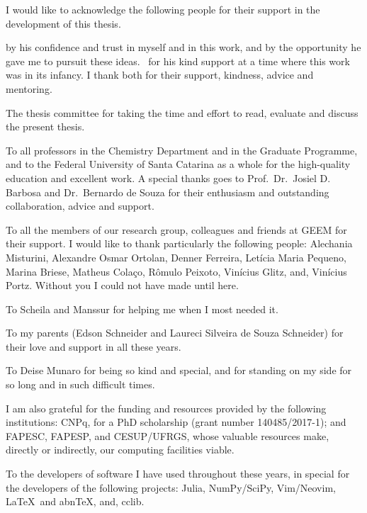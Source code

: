 \begin{agradecimentos}[Acknowledgements]
I would like to acknowledge the following people for their support in the
development of this thesis.

\imprimirorientador by his confidence and trust in myself and in this work, and by the
opportunity he gave me to pursuit these ideas.
\imprimircoorientador\ for his kind support at a time where this work was in its
infancy.
I thank both for their support, kindness, advice and mentoring.

The thesis committee for taking the time and effort to read, evaluate and
discuss the present thesis.

To all professors in the Chemistry Department and in the Graduate Programme, and to the Federal University of
Santa Catarina as a whole
for the high-quality education and excellent work.
A special thanks goes to Prof.\ Dr.\ Josiel D. Barbosa and
Dr.\ Bernardo de Souza
for their enthusiasm and outstanding collaboration, advice and support.

To all the members of our research group, colleagues and friends at GEEM for
their support.
I would like to thank particularly the following people:
Alechania Misturini,
Alexandre Osmar Ortolan,
Denner Ferreira,
Letícia Maria Pequeno,
Marina Briese,
Matheus Colaço,
Rômulo Peixoto,
Vinícius Glitz,
and,
Vinícius Portz.
Without you I could not have made until here.

To Scheila and Manssur for helping me when I most needed it.

To my parents (Edson Schneider and Laureci Silveira de Souza Schneider)
for their love and support in all these years.

To Deise Munaro for being so kind and special,
and for standing on my side for so long and in such difficult times.

I am also grateful for the funding and resources provided by the following institutions:
CNPq, for a PhD scholarship (grant number 140485/2017-1);
and FAPESC, FAPESP, and CESUP/UFRGS, whose valuable resources make, directly or
indirectly, our computing facilities
viable.

To the developers of software I have used throughout these years, in special for
the developers of the following projects:
Julia,
NumPy/SciPy,
Vim/Neovim,
\LaTeX\ and abn\TeX{},
and,
cclib.

\end{agradecimentos}
